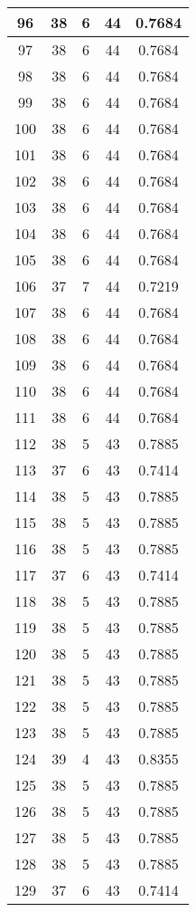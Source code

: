 \documentclass[letterpaper, 12pt]{article}
\begin{document}
\begin{longtable}{|c|c|c|c|c|}
\hline
96 & 38 & 6 & 44 & 0.7684 \\
\hline
97 & 38 & 6 & 44 & 0.7684 \\
\hline
98 & 38 & 6 & 44 & 0.7684 \\
\hline
99 & 38 & 6 & 44 & 0.7684 \\
\hline
100 & 38 & 6 & 44 & 0.7684 \\
\hline
101 & 38 & 6 & 44 & 0.7684 \\
\hline
102 & 38 & 6 & 44 & 0.7684 \\
\hline
103 & 38 & 6 & 44 & 0.7684 \\
\hline
104 & 38 & 6 & 44 & 0.7684 \\
\hline
105 & 38 & 6 & 44 & 0.7684 \\
\hline
106 & 37 & 7 & 44 & 0.7219 \\
\hline
107 & 38 & 6 & 44 & 0.7684 \\
\hline
108 & 38 & 6 & 44 & 0.7684 \\
\hline
109 & 38 & 6 & 44 & 0.7684 \\
\hline
110 & 38 & 6 & 44 & 0.7684 \\
\hline
111 & 38 & 6 & 44 & 0.7684 \\
\hline
112 & 38 & 5 & 43 & 0.7885 \\
\hline
113 & 37 & 6 & 43 & 0.7414 \\
\hline
114 & 38 & 5 & 43 & 0.7885 \\
\hline
115 & 38 & 5 & 43 & 0.7885 \\
\hline
116 & 38 & 5 & 43 & 0.7885 \\
\hline
117 & 37 & 6 & 43 & 0.7414 \\
\hline
118 & 38 & 5 & 43 & 0.7885 \\
\hline
119 & 38 & 5 & 43 & 0.7885 \\
\hline
120 & 38 & 5 & 43 & 0.7885 \\
\hline
121 & 38 & 5 & 43 & 0.7885 \\
\hline
122 & 38 & 5 & 43 & 0.7885 \\
\hline
123 & 38 & 5 & 43 & 0.7885 \\
\hline
124 & 39 & 4 & 43 & 0.8355 \\
\hline
125 & 38 & 5 & 43 & 0.7885 \\
\hline
126 & 38 & 5 & 43 & 0.7885 \\
\hline
127 & 38 & 5 & 43 & 0.7885 \\
\hline
128 & 38 & 5 & 43 & 0.7885 \\
\hline
129 & 37 & 6 & 43 & 0.7414 \\

\end{longtable}
\end{document}

